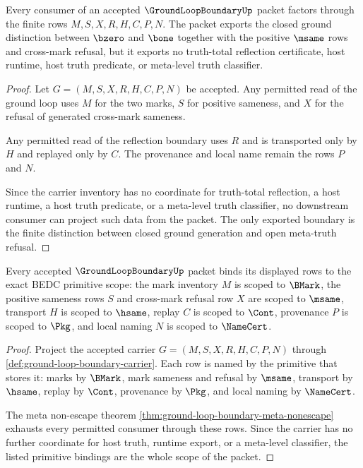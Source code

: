 \begin{theorem}
\label{thm:ground-loop-boundary-meta-nonescape}
Every consumer of an accepted $\GroundLoopBoundaryUp$ packet factors through the finite rows $M,S,X,R,H,C,P,N$. The packet exports the closed ground distinction between $\bzero$ and $\bone$ together with the positive $\msame$ rows and cross-mark refusal, but it exports no truth-total reflection certificate, host runtime, host truth predicate, or meta-level truth classifier.
\end{theorem}
\begin{proof}
Let $G=(M,S,X,R,H,C,P,N)$ be accepted. Any permitted read of the ground loop uses $M$ for the two marks, $S$ for positive sameness, and $X$ for the refusal of generated cross-mark sameness.

Any permitted read of the reflection boundary uses $R$ and is transported only by $H$ and replayed only by $C$. The provenance and local name remain the rows $P$ and $N$.

Since the carrier inventory has no coordinate for truth-total reflection, a host runtime, a host truth predicate, or a meta-level truth classifier, no downstream consumer can project such data from the packet. The only exported boundary is the finite distinction between closed ground generation and open meta-truth refusal.
\end{proof}

\begin{theorem}
\label{thm:ground-loop-boundary-scoped-kernel-route}
Every accepted $\GroundLoopBoundaryUp$ packet binds its displayed rows to the exact BEDC primitive scope: the mark inventory $M$ is scoped to $\BMark$, the positive sameness rows $S$ and cross-mark refusal row $X$ are scoped to $\msame$, transport $H$ is scoped to $\hsame$, replay $C$ is scoped to $\Cont$, provenance $P$ is scoped to $\Pkg$, and local naming $N$ is scoped to $\NameCert$.
\end{theorem}
\begin{proof}
Project the accepted carrier $G=(M,S,X,R,H,C,P,N)$ through \autoref{def:ground-loop-boundary-carrier}. Each row is named by the primitive that stores it: marks by $\BMark$, mark sameness and refusal by $\msame$, transport by $\hsame$, replay by $\Cont$, provenance by $\Pkg$, and local naming by $\NameCert$.

The meta non-escape theorem \autoref{thm:ground-loop-boundary-meta-nonescape} exhausts every permitted consumer through these rows. Since the carrier has no further coordinate for host truth, runtime export, or a meta-level classifier, the listed primitive bindings are the whole scope of the packet.
\end{proof}

